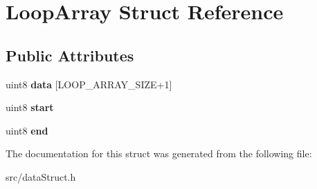 \hypertarget{struct_loop_array}{}\section{Loop\+Array Struct Reference}
\label{struct_loop_array}
\subsection*{Public Attributes}
\begin{DoxyCompactItemize}
\item 
\hypertarget{struct_loop_array_a90ee282e51d8e64d02150e9088fa5631}{}uint8 {\bfseries data} \mbox{[}L\+O\+O\+P\+\_\+\+A\+R\+R\+A\+Y\+\_\+\+S\+I\+Z\+E+1\mbox{]}\label{struct_loop_array_a90ee282e51d8e64d02150e9088fa5631}

\item 
\hypertarget{struct_loop_array_a9d15d312cdb8baa8feead63708340f63}{}uint8 {\bfseries start}\label{struct_loop_array_a9d15d312cdb8baa8feead63708340f63}

\item 
\hypertarget{struct_loop_array_aafb8bc9cbc28db9f710d3a516bd819ad}{}uint8 {\bfseries end}\label{struct_loop_array_aafb8bc9cbc28db9f710d3a516bd819ad}

\end{DoxyCompactItemize}


The documentation for this struct was generated from the following file\+:\begin{DoxyCompactItemize}
\item 
src/data\+Struct.\+h\end{DoxyCompactItemize}

